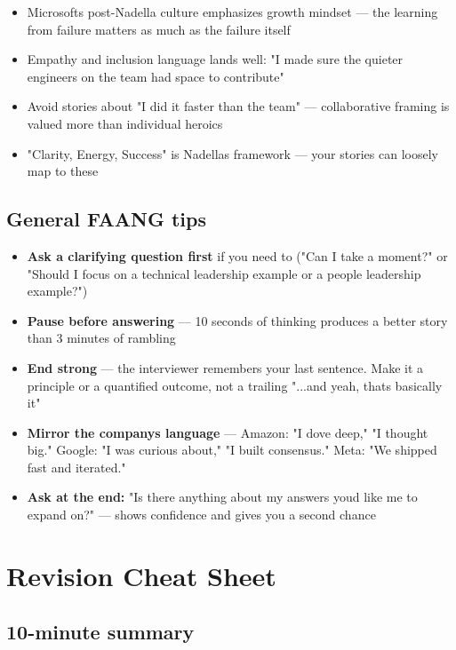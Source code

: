 \documentclass[11pt]{article}
\providecommand{\tightlist}{\setlength{\itemsep}{1pt}\setlength{\parskip}{0pt}}
\begin{document}
\begin{itemize}
\tightlist
\item
  Microsoft\textquotesingle s post-Nadella culture emphasizes growth mindset --- the learning from failure matters as much as the failure itself
\item
  Empathy and inclusion language lands well: "I made sure the quieter engineers on the team had space to contribute"
\item
  Avoid stories about "I did it faster than the team" --- collaborative framing is valued more than individual heroics
\item
  "Clarity, Energy, Success" is Nadella\textquotesingle s framework --- your stories can loosely map to these
\end{itemize}

\subsection{General FAANG tips}\label{general-faang-tips}

\begin{itemize}
\tightlist
\item
  \textbf{Ask a clarifying question first} if you need to ("Can I take a moment?" or "Should I focus on a technical leadership example or a people leadership example?")
\item
  \textbf{Pause before answering} --- 10 seconds of thinking produces a better story than 3 minutes of rambling
\item
  \textbf{End strong} --- the interviewer remembers your last sentence. Make it a principle or a quantified outcome, not a trailing "...and yeah, that\textquotesingle s basically it"
\item
  \textbf{Mirror the company\textquotesingle s language} --- Amazon: "I dove deep," "I thought big." Google: "I was curious about," "I built consensus." Meta: "We shipped fast and iterated."
\item
  \textbf{Ask at the end:} "Is there anything about my answers you\textquotesingle d like me to expand on?" --- shows confidence and gives you a second chance
\end{itemize}

\section{Revision Cheat Sheet}\label{revision-cheat-sheet}

\subsection{10-minute summary}\label{10-minute-summary}
\end{document}
